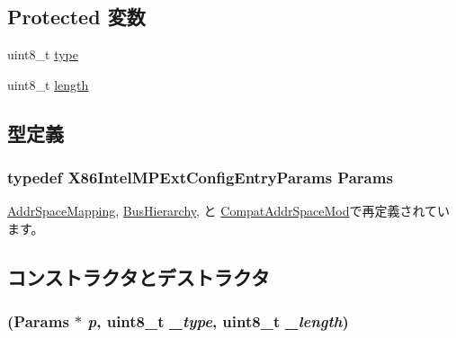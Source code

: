 \subsection*{Protected 変数}
\begin{DoxyCompactItemize}
\item 
uint8\_\-t \hyperlink{classX86ISA_1_1IntelMP_1_1ExtConfigEntry_a1d127017fb298b889f4ba24752d08b8e}{type}
\item 
uint8\_\-t \hyperlink{classX86ISA_1_1IntelMP_1_1ExtConfigEntry_ab2b3adeb2a67e656ff030b56727fd0ac}{length}
\end{DoxyCompactItemize}


\subsection{型定義}
\hypertarget{classX86ISA_1_1IntelMP_1_1ExtConfigEntry_ac05617332b889b2a33387663c048f2a9}{
\subsubsection[{Params}]{\setlength{\rightskip}{0pt plus 5cm}typedef X86IntelMPExtConfigEntryParams {\bf Params}}}
\label{classX86ISA_1_1IntelMP_1_1ExtConfigEntry_ac05617332b889b2a33387663c048f2a9}


\hyperlink{classX86ISA_1_1IntelMP_1_1AddrSpaceMapping_a1ca24332f3ea92d341d5295799303c05}{AddrSpaceMapping}, \hyperlink{classX86ISA_1_1IntelMP_1_1BusHierarchy_a58526583d25b12675822cc32f4617567}{BusHierarchy}, と \hyperlink{classX86ISA_1_1IntelMP_1_1CompatAddrSpaceMod_a5f6d926d4afade776b21c22d1811adf8}{CompatAddrSpaceMod}で再定義されています。

\subsection{コンストラクタとデストラクタ}
\hypertarget{classX86ISA_1_1IntelMP_1_1ExtConfigEntry_a43351247a3aaa41f6efa41834a1e1e39}{
\subsubsection[{ExtConfigEntry}]{ ({\bf Params} $\ast$ {\em p}, \/  uint8\_\-t {\em \_\-type}, \/  uint8\_\-t {\em \_\-length})}}
\label{classX86ISA_1_1IntelMP_1_1ExtConfigEntry_a43351247a3aaa41f6efa41834a1e1e39}



